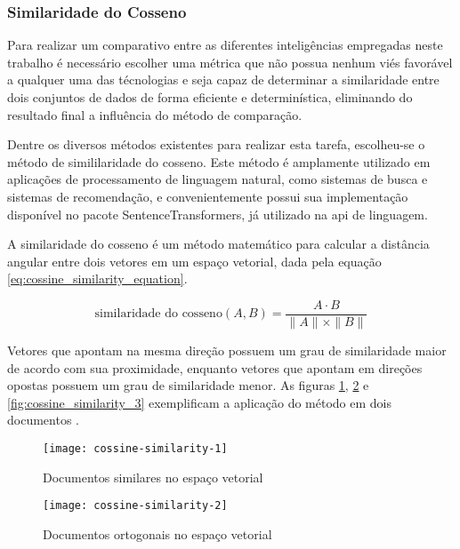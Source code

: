 \subsubsection{Similaridade do Cosseno}\label{subsubsec:cossine_similarity}

Para realizar um comparativo entre as diferentes inteligências empregadas neste trabalho é necessário escolher uma métrica que não possua nenhum viés favorável a qualquer uma das técnologias e seja capaz de determinar a similaridade entre dois conjuntos de dados de forma eficiente e determinística, eliminando do resultado final a influência do método de comparação.

Dentre os diversos métodos existentes para realizar esta tarefa, escolheu-se o método de simililaridade do cosseno. Este método é amplamente utilizado em aplicações de processamento de linguagem natural, como sistemas de busca e sistemas de recomendação, e convenientemente possui sua implementação disponível no pacote SentenceTransformers, já utilizado na \gls{api} de linguagem.

A similaridade do cosseno é um método matemático para calcular a distância angular entre dois vetores em um espaço vetorial, dada pela equação \ref{eq:cossine_similarity_equation}.

\begin{equation}
    \label{eq:cossine_similarity_equation}
    \text{similaridade do cosseno}(A, B) = \frac{A \cdot B}{\|A\| \times \|B\|}
\end{equation}

Vetores que apontam na mesma direção possuem um grau de similaridade maior de acordo com sua proximidade, enquanto vetores que apontam em direções opostas possuem um grau de similaridade menor. As figuras \ref{fig:cossine_similarity_1}, \ref{fig:cossine_similarity_2} e \ref{fig:cossine_similarity_3} exemplificam a aplicação do método em dois documentos \cite{YlberArtan2022}.

\begin{figure}[htb]
    \caption{Documentos similares no espaço vetorial}
    \texttt{[image: cossine-similarity-1]}
    \label{fig:cossine_similarity_1}
\end{figure}

\begin{figure}[htb]
    \caption{Documentos ortogonais no espaço vetorial}
    \texttt{[image: cossine-similarity-2]}
    \label{fig:cossine_similarity_2}
\end{figure}

